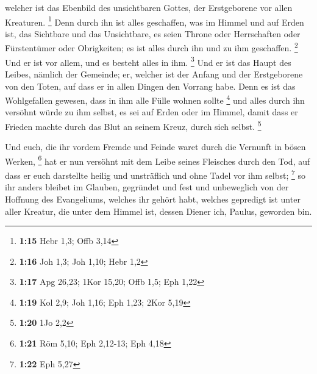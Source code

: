  welcher ist das Ebenbild des unsichtbaren Gottes, der
Erstgeborene vor allen Kreaturen. \footnote{\textbf{1:15} Hebr 1,3; Offb
  3,14}  Denn durch ihn ist alles geschaffen, was im Himmel
und auf Erden ist, das Sichtbare und das Unsichtbare, es seien Throne
oder Herrschaften oder Fürstentümer oder Obrigkeiten; es ist alles durch
ihn und zu ihm geschaffen. \footnote{\textbf{1:16} Joh 1,3; Joh 1,10;
  Hebr 1,2}  Und er ist vor allem, und es besteht alles in
ihm. \footnote{\textbf{1:17} Apg 26,23; 1Kor 15,20; Offb 1,5; Eph 1,22}
 Und er ist das Haupt des Leibes, nämlich der Gemeinde; er,
welcher ist der Anfang und der Erstgeborene von den Toten, auf dass er
in allen Dingen den Vorrang habe.  Denn es ist das
Wohlgefallen gewesen, dass in ihm alle Fülle wohnen sollte \footnote{\textbf{1:19}
  Kol 2,9; Joh 1,16; Eph 1,23; 2Kor 5,19}  und alles durch
ihn versöhnt würde zu ihm selbst, es sei auf Erden oder im Himmel, damit
dass er Frieden machte durch das Blut an seinem Kreuz, durch sich
selbst. \footnote{\textbf{1:20} 1Jo 2,2}

 Und euch, die ihr vordem Fremde und Feinde waret durch die
Vernunft in bösen Werken, \footnote{\textbf{1:21} Röm 5,10; Eph 2,12-13;
  Eph 4,18}  hat er nun versöhnt mit dem Leibe seines
Fleisches durch den Tod, auf dass er euch darstellte heilig und
unsträflich und ohne Tadel vor ihm selbst; \footnote{\textbf{1:22} Eph
  5,27}  so ihr anders bleibet im Glauben, gegründet und
fest und unbeweglich von der Hoffnung des Evangeliums, welches ihr
gehört habt, welches gepredigt ist unter aller Kreatur, die unter dem
Himmel ist, dessen Diener ich, Paulus, geworden bin.

